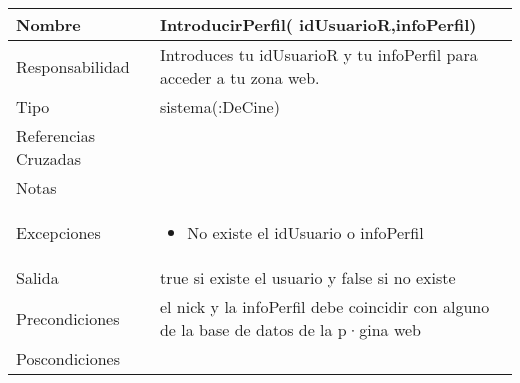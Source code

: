 \documentclass{article}
\begin{document}
\begin{table}[h]
\begin{tabular}{|l|l|l|l|l|l|}
\hline
\multicolumn{2}{|p{3cm}|}{Nombre} & \multicolumn{4}{p{10cm}|}{\textbf{IntroducirPerfil( idUsuarioR,infoPerfil)}}\\
\hline
\multicolumn{2}{|p{3cm}|}{Responsabilidad} & \multicolumn{4}{p{10cm}|}{Introduces tu idUsuarioR y tu infoPerfil para acceder a tu zona web.} \\
\hline
\multicolumn{2}{|p{3cm}|}{Tipo} & \multicolumn{4}{p{10cm}|}{sistema(:DeCine)} \\
\hline
\multicolumn{2}{|p{3cm}|}{Referencias Cruzadas} & \multicolumn{4}{p{10cm}|}{} \\
\hline
\multicolumn{2}{|p{3cm}|}{Notas} & \multicolumn{4}{p{10cm}|}{} \\
\hline
\multicolumn{2}{|p{3cm}|}{Excepciones} & \multicolumn{4}{p{10cm}|}{\begin{itemize}
\item No existe el idUsuario o infoPerfil
\end{itemize}} \\
\hline
\multicolumn{2}{|p{3cm}|}{Salida} & \multicolumn{4}{p{10cm}|}{true si existe el usuario y false si no existe} \\
\hline
\multicolumn{2}{|p{3cm}|}{Precondiciones} & \multicolumn{4}{p{10cm}|}{el nick y la infoPerfil debe coincidir con alguno de la base de datos de la p·gina web} \\
\hline
\multicolumn{2}{|p{3cm}|}{Poscondiciones} & \multicolumn{4}{p{10cm}|}{} \\
\hline
\end{tabular}
\end{table}
\end{document}
